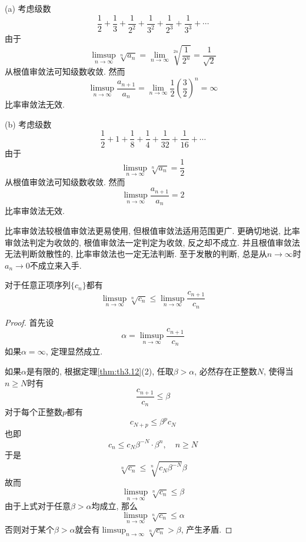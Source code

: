 \documentclass[cn,12pt,math=mtpro2,citestyle=gb7714-2015,bibstyle=gb7714-2015,twocol]{elegantbook}
\newcommand{\limn}{\lim_{n\to\infty}}
\begin{document}
\begin{example}
(a) 考虑级数
$$\frac{1}{2}+\frac{1}{3}+\frac{1}{2^2}+\frac{1}{3^2}+\frac{1}{2^3}+\frac{1}{3^3}+\cdots$$
由于
$$\displaystyle\limsup_{n\to\infty}\sqrt[n]{a_n}=\limn \sqrt[2n]{\frac{1}{2^n}}=\frac{1}{\sqrt{2}}$$
从根值审敛法可知级数收敛. 然而
$$\displaystyle\limsup_{n\to\infty}\frac{a_{n+1}}{a_n}=\limn \frac{1}{2}\left(\frac{3}{2}\right)^n=\infty$$
 比率审敛法无效.

 (b) 考虑级数
 $$\frac{1}{2}+1+\frac{1}{8}+\frac{1}{4}+\frac{1}{32}+\frac{1}{16}+\cdots$$
 由于
 $$\displaystyle\limsup_{n\to\infty}\sqrt[n]{a_n}=\frac{1}{2}$$
从根值审敛法可知级数收敛. 然而
$$\displaystyle\limsup_{n\to\infty}\frac{a_{n+1}}{a_n}=2$$
 比率审敛法无效.
\end{example}
\begin{remark}
比率审敛法较根值审敛法更易使用, 但根值审敛法适用范围更广. 更确切地说, 比率审敛法判定为收敛的, 根值审敛法一定判定为收敛, 反之却不成立. 并且根值审敛法无法判断敛散性的, 比率审敛法也一定无法判断. 至于发散的判断, 总是从$n\rightarrow\infty$时$a_n\rightarrow0$不成立来入手.
\end{remark}
\begin{theorem}
  对于任意正项序列$\{c_n\}$都有
  $$\limsup_{n\to\infty}\sqrt[n]{c_n}\leq\limsup_{n\to\infty}\frac{c_{n+1}}{c_n}$$
\end{theorem}
\begin{proof}
  首先设$$\displaystyle\alpha=\limsup_{n\to\infty}\frac{c_{n+1}}{c_n}$$ 如果$\alpha=\infty$, 定理显然成立.

  如果$\alpha$是有限的, 根据定理\ref{thm:th3.12}(2), 任取$\beta>\alpha$, 必然存在正整数$N$, 使得当$n\geq N$时有
  $$\frac{c_{n+1}}{c_n}\leq \beta$$
  对于每个正整数$p$都有
  $$c_{N+p}\leq \beta^p c_N$$
  也即
  $$c_n\leq c_N\beta^{-N}\cdot \beta^n, \quad n\geq N$$
  于是
  $$\sqrt[n]{c_n}\leq\sqrt[n]{c_N\beta^{-N}}\beta$$
  故而
  $$\limsup_{n\to\infty}\sqrt[n]{c_n}\leq\beta$$
  由于上式对于任意$\beta>\alpha$均成立, 那么
  $$\limsup_{n\to\infty}\sqrt[n]{c_n}\leq\alpha$$
  否则对于某个$\beta>\alpha$就会有$\limsup_{n\to\infty}\sqrt[n]{c_n}>\beta$, 产生矛盾.
\end{proof}
\end{document}
